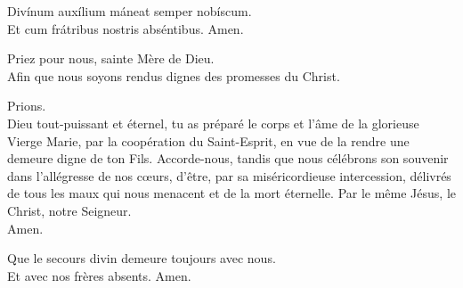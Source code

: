\documentclass[twoside]{article}
\begin{document}
\begin{paracol}[1]{2}
\vv Divínum auxílium \cc máneat semper nobíscum. \\
\rr Et cum frátribus nostris abséntibus. Amen.

\switchcolumn

\vv Priez pour nous, sainte Mère de Dieu.\\
\rr Afin que nous soyons rendus dignes des promesses du Christ.

Prions. \\
Dieu tout-puissant et éternel, tu as préparé le corps et l’âme de la glorieuse Vierge Marie, par la coopération du Saint-Esprit, en vue de la rendre une demeure digne de ton Fils. Accorde-nous, tandis que nous célébrons son souvenir dans l’allégresse de nos cœurs, d’être, par sa miséricordieuse intercession, délivrés de tous les maux qui nous menacent et de la mort éternelle. Par le même Jésus, le Christ, notre Seigneur.\\
\rr Amen.

\vv Que le secours divin \cc demeure toujours avec nous.\\
\rr Et avec nos frères absents. Amen.

\end{paracol}
\end{document}
